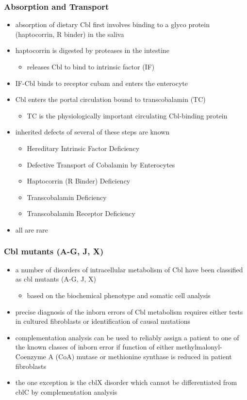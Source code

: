 \documentclass{scrartcl}
\begin{document}
\subsubsection{Absorption and Transport}
\label{sec:org60085f2}
\begin{itemize}
\item absorption of dietary Cbl first involves binding to a glyco protein
(haptocorrin, R binder) in the saliva
\item haptocorrin is digested by proteases in the intestine
\begin{itemize}
\item releases Cbl to bind to intrinsic factor (IF)
\end{itemize}
\item IF-Cbl binds to receptor cubam and enters the enterocyte
\item Cbl enters the portal circulation bound to transcobalamin (TC)
\begin{itemize}
\item TC is the physiologically important circulating Cbl-binding
protein
\end{itemize}
\item inherited defects of several of these steps are known
\begin{itemize}
\item Hereditary Intrinsic Factor Deficiency
\item Defective Transport of Cobalamin by Enterocytes
\item Haptocorrin (R Binder) Deficiency
\item Transcobalamin Deficiency
\item Transcobalamin Receptor Deficiency
\end{itemize}
\item all are rare
\end{itemize}
\subsubsection{Cbl mutants (A-G, J, X)}
\label{sec:orgc3c6d9f}
\begin{itemize}
\item a number of disorders of intracellular metabolism of Cbl have been
classified as cbl mutants (A-G, J, X)
\begin{itemize}
\item based on the biochemical phenotype and somatic cell analysis
\end{itemize}
\item precise diagnosis of the inborn errors of Cbl metabolism requires
either tests in cultured fibroblasts or identification of causal
mutations
\item complementation analysis can be used to reliably assign a patient to
one of the known classes of inborn error if function of either
methylmalonyl-Coenzyme A (CoA) mutase or methionine synthase is
reduced in patient fibroblasts
\item the one exception is the cblX disorder which cannot be
differentiated from cblC by complementation analysis
\end{itemize}
\end{document}
